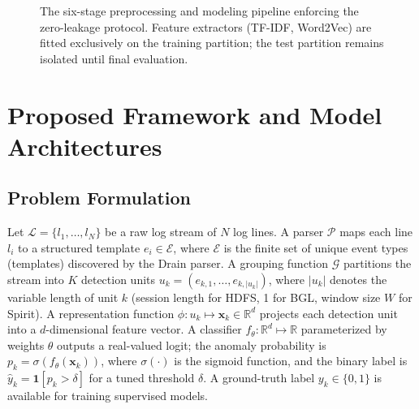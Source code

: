 \documentclass{elektr}
\begin{document}
\begin{figure}[h!]
\begin{center}
\caption{The six-stage preprocessing and modeling pipeline enforcing the
zero-leakage protocol. Feature extractors (TF-IDF, Word2Vec) are fitted
exclusively on the training partition; the test partition remains isolated
until final evaluation.}
\label{fig:pipeline}
\end{center}\vs{-4mm}
\end{figure}

\section{Proposed Framework and Model Architectures}
\label{Sec:Framework}

\subsection{Problem Formulation}

Let $\mathcal{L}=\{l_1,\ldots,l_N\}$ be a raw log stream of $N$ log lines.
A parser $\mathcal{P}$ maps each line $l_i$ to a structured template
$e_i\in\mathcal{E}$, where $\mathcal{E}$ is the finite set of unique event
types (templates) discovered by the Drain parser. A grouping function
$\mathcal{G}$ partitions the stream into $K$ detection units
$u_k=(e_{k,1},\ldots,e_{k,|u_k|})$, where $|u_k|$ denotes the variable length
of unit $k$ (session length for HDFS, 1 for BGL, window size $W$ for Spirit).
A representation function $\phi: u_k\mapsto\mathbf{x}_k\in\mathbb{R}^d$ projects
each detection unit into a $d$-dimensional feature vector. A classifier
$f_\theta:\mathbb{R}^d\mapsto\mathbb{R}$ parameterized by weights $\theta$ outputs
a real-valued logit; the anomaly probability is $p_k = \sigma(f_\theta(\mathbf{x}_k))$,
where $\sigma(\cdot)$ is the sigmoid function, and the binary label is
$\hat{y}_k = \mathbf{1}[p_k > \delta]$ for a tuned threshold $\delta$.
A ground-truth label $y_k\in\{0,1\}$ is available for training supervised models.
\end{document}
